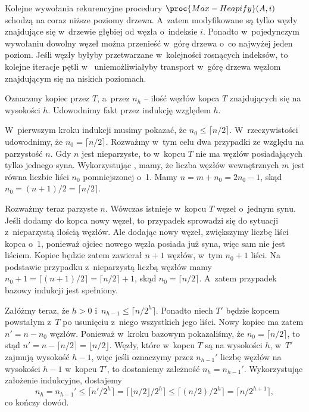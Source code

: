 \exercise %
Kolejne wywołania rekurencyjne procedury $\proc{Max-Heapify}(A,i)$ schodzą na coraz niższe poziomy drzewa. A~zatem modyfikowane są tylko węzły znajdujące się w~drzewie głębiej od węzła o~indeksie $i$. Ponadto w~pojedynczym wywołaniu  dowolny węzeł można przenieść w~górę drzewa o~co najwyżej jeden poziom. Jeśli węzły byłyby przetwarzane w~kolejności rosnących indeksów, to kolejne iteracje pętli  w~ uniemożliwiałyby transport w~górę drzewa węzłom znajdującym się na niskich poziomach.

\exercise %
Oznaczmy kopiec przez $T$, a~przez $n_h$ -- ilość węzłów kopca $T$ znajdujących się na wysokości $h$. Udowodnimy fakt przez indukcję względem $h$.

W~pierwszym kroku indukcji musimy pokazać, że $n_0\le\lceil n/2\rceil$. W~rzeczywistości udowodnimy, że $n_0=\lceil n/2\rceil$. Rozważmy w~tym celu dwa przypadki ze względu na parzystość $n$. Gdy $n$ jest nieparzyste, to w~kopcu $T$ nie ma węzłów posiadających tylko jednego syna. Wykorzystując , mamy, że liczba węzłów wewnętrznych $m$ jest równa liczbie liści $n_0$ pomniejszonej o~1. Mamy $n=m+n_0=2n_0-1$, skąd $n_0=(n+1)/2=\lceil n/2\rceil$.

Rozważmy teraz parzyste $n$. Wówczas istnieje w~kopcu $T$ węzeł o~jednym synu. Jeśli dodamy do kopca nowy węzeł, to przypadek sprowadzi się do sytuacji z~nieparzystą ilością węzłów. Ale dodając nowy węzeł, zwiększymy liczbę liści kopca o~1, ponieważ ojciec nowego węzła posiada już syna, więc sam nie jest liściem. Kopiec będzie zatem zawierał $n+1$ węzłów, w~tym $n_0+1$ liści. Na podstawie przypadku z~nieparzystą liczbą węzłów mamy $n_0+1=\lceil(n+1)/2\rceil=\lceil n/2\rceil+1$, skąd $n_0=\lceil n/2\rceil$. A~zatem przypadek bazowy indukcji jest spełniony.

Załóżmy teraz, że $h>0$ i~$n_{h-1}\le\lceil n/2^h\rceil$. Ponadto niech $T'$ będzie kopcem powstałym z~$T$ po usunięciu z~niego wszystkich jego liści. Nowy kopiec ma zatem $n'=n-n_0$ węzłów. Ponieważ w~kroku bazowym pokazaliśmy, że $n_0=\lceil n/2\rceil$, to stąd $n'=n-\lceil n/2\rceil=\lfloor n/2\rfloor$. Węzły, które w~kopcu $T$ są na wysokości $h$, w~$T'$ zajmują wysokość $h-1$, więc jeśli oznaczymy przez $n_{h-1}'$ liczbę węzłów na wysokości $h-1$ w~kopcu $T'$, to dostaniemy zależność $n_h=n_{h-1}'$. Wykorzystując założenie indukcyjne, dostajemy
\[
    n_h = n_{h-1}' \le \lceil n'/2^h\rceil = \lceil\lfloor n/2\rfloor/2^h\rceil \le \lceil(n/2)/2^h\rceil = \lceil n/2^{h+1}\rceil,
\]
co kończy dowód.

